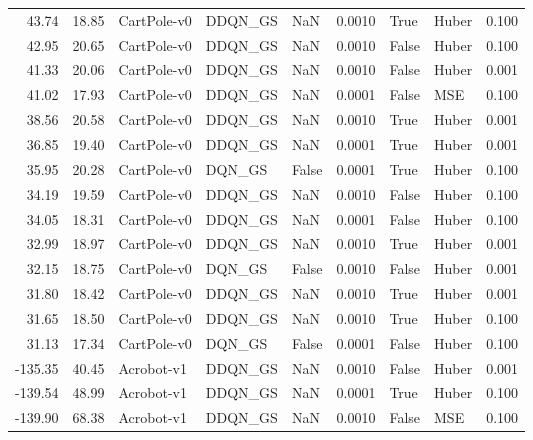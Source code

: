 \begin{tabular}{rrlllrllr}
  43.74 &   18.85 &     CartPole-v0 &  DDQN\_GS &    NaN &  0.0010 &      True &         Huber &         0.100 \\
  42.95 &   20.65 &     CartPole-v0 &  DDQN\_GS &    NaN &  0.0010 &     False &         Huber &         0.100 \\
  41.33 &   20.06 &     CartPole-v0 &  DDQN\_GS &    NaN &  0.0010 &     False &         Huber &         0.001 \\
  41.02 &   17.93 &     CartPole-v0 &  DDQN\_GS &    NaN &  0.0001 &     False &           MSE &         0.100 \\
  38.56 &   20.58 &     CartPole-v0 &  DDQN\_GS &    NaN &  0.0010 &      True &         Huber &         0.001 \\
  36.85 &   19.40 &     CartPole-v0 &  DDQN\_GS &    NaN &  0.0001 &      True &         Huber &         0.001 \\
  35.95 &   20.28 &     CartPole-v0 &   DQN\_GS &  False &  0.0001 &      True &         Huber &         0.100 \\
  34.19 &   19.59 &     CartPole-v0 &  DDQN\_GS &    NaN &  0.0010 &     False &         Huber &         0.100 \\
  34.05 &   18.31 &     CartPole-v0 &  DDQN\_GS &    NaN &  0.0001 &     False &         Huber &         0.100 \\
  32.99 &   18.97 &     CartPole-v0 &  DDQN\_GS &    NaN &  0.0010 &      True &         Huber &         0.001 \\
  32.15 &   18.75 &     CartPole-v0 &   DQN\_GS &  False &  0.0010 &     False &         Huber &         0.001 \\
  31.80 &   18.42 &     CartPole-v0 &  DDQN\_GS &    NaN &  0.0010 &      True &         Huber &         0.001 \\
  31.65 &   18.50 &     CartPole-v0 &  DDQN\_GS &    NaN &  0.0010 &      True &         Huber &         0.100 \\
  31.13 &   17.34 &     CartPole-v0 &   DQN\_GS &  False &  0.0001 &     False &         Huber &         0.100 \\
-135.35 &   40.45 &      Acrobot-v1 &  DDQN\_GS &    NaN &  0.0010 &     False &         Huber &         0.001 \\
-139.54 &   48.99 &      Acrobot-v1 &  DDQN\_GS &    NaN &  0.0001 &      True &         Huber &         0.100 \\
-139.90 &   68.38 &      Acrobot-v1 &  DDQN\_GS &    NaN &  0.0010 &     False &           MSE &         0.100 \\

\end{tabular}
